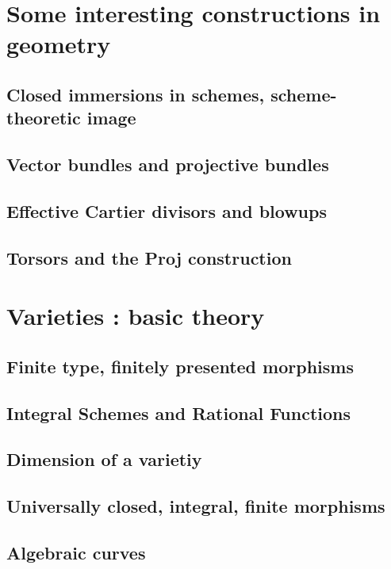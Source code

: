 \documentclass{article}
\begin{document}
\section{Some interesting constructions in geometry}
  \subsection{Closed immersions in schemes, scheme-theoretic image}
    
  \subsection{Vector bundles and projective bundles}
  \subsection{Effective Cartier divisors and blowups}
  \subsection{Torsors and the Proj construction}

\section{Varieties : basic theory}
  \subsection{Finite type, finitely presented morphisms}
  \subsection{Integral Schemes and Rational Functions}
  \subsection{Dimension of a varietiy}
  \subsection{Universally closed, integral, finite morphisms}
  \subsection{Algebraic curves}
\end{document}
